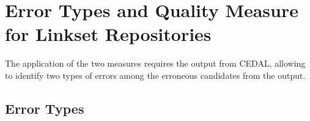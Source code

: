 
\section{Error Types and Quality Measure for Linkset Repositories} \label{sessionErrorQuality}

The application of the two measures requires the output from CEDAL, allowing to identify two types of errors among the erroneous candidates from the output.


\subsection{Error Types} \label{errorType}




